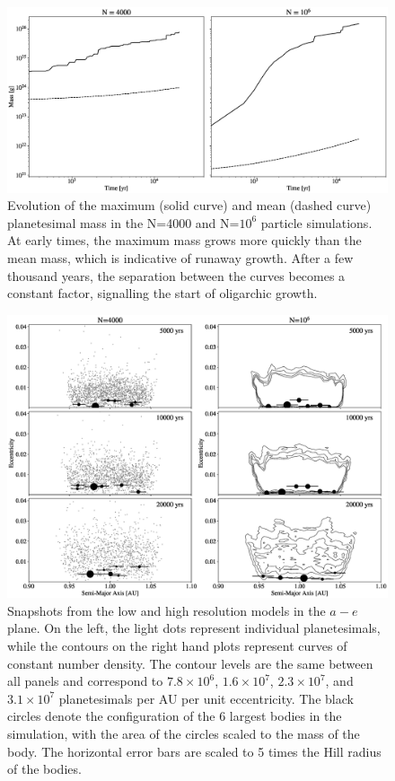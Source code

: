 \documentclass [11pt, proquest] {uwthesis}[2020/02/24]
\begin{document}
\begin{figure}
    \includegraphics[width=\textwidth]{figures/plSS/mass_evo.eps}
    \caption{Evolution of the maximum (solid curve) and mean (dashed curve) planetesimal mass in the N=4000 and N=$10^6$ particle simulations. At early times, the maximum mass grows more quickly than the mean mass, which is indicative of runaway growth. After a few thousand years, the separation between the curves becomes a constant factor, signalling the start of oligarchic growth.
    \label{fig:mass_evo}}
\end{figure}

\begin{figure}
    \includegraphics[width=\textwidth]{figures/plSS/ecc_evo.eps}
    \caption{Snapshots from the low and high resolution models in the $a-e$ plane. On the left, the light dots represent individual planetesimals, while the contours on the right hand plots represent curves of constant number density. The contour levels are the same between all panels and correspond to $7.8 \times 10^6$, $1.6 \times 10^7$, $2.3 \times 10^7$, and $3.1 \times 10^7$ planetesimals per AU per unit eccentricity. The black circles denote the configuration of the 6 largest bodies in the simulation, with the area of the circles scaled to the mass of the body. The horizontal error bars are scaled to 5 times the Hill radius of the bodies.
    \label{fig:ae}}
\end{figure}
\end{document}
